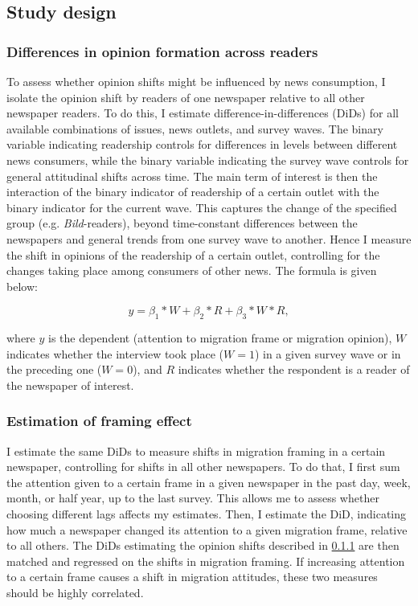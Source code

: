 \documentclass{article}
\begin{document}
\subsection{Study design}

\subsubsection{Differences in opinion formation across readers}\label{sec:did_readers}

To assess whether opinion shifts might be influenced by news consumption, I isolate the opinion shift by readers of one newspaper relative to all other newspaper readers. To do this, I estimate difference-in-differences (DiDs) for all available combinations of issues, news outlets, and survey waves. The binary variable indicating readership controls for differences in levels between different news consumers, while the binary variable indicating the survey wave controls for general attitudinal shifts across time. The main term of interest is then the interaction of the binary indicator of readership of a certain outlet with the binary indicator for the current wave. This captures the change of the specified group (e.g. \textit{Bild}-readers), beyond time-constant differences between the newspapers and general trends from one survey wave to another. Hence I measure the shift in opinions of the readership of a certain outlet, controlling for the changes taking place among consumers of other news. The formula is given below:

$$ y = \beta_1 * W + \beta_2 * R + \beta_3 * W * R, $$

where $y$ is the dependent (attention to migration frame or migration opinion), $W$ indicates whether the interview took place ($W = 1$) in a given survey wave or in the preceding one ($W = 0$), and $R$ indicates whether the respondent is a reader of the newspaper of interest.


\subsubsection{Estimation of framing effect}\label{sec:models}

I estimate the same DiDs to measure shifts in migration framing in a certain newspaper, controlling for shifts in all other newspapers. To do that, I first sum the attention given to a certain frame in a given newspaper in the past day, week, month, or half year, up to the last survey. This allows me to assess whether choosing different lags affects my estimates. Then, I estimate the DiD, indicating how much a newspaper changed its attention to a given migration frame, relative to all others. The DiDs estimating the opinion shifts described in \ref{sec:did_readers} are then matched and regressed on the shifts in migration framing. If increasing attention to a certain frame causes a shift in migration attitudes, these two measures should be highly correlated.
\end{document}
